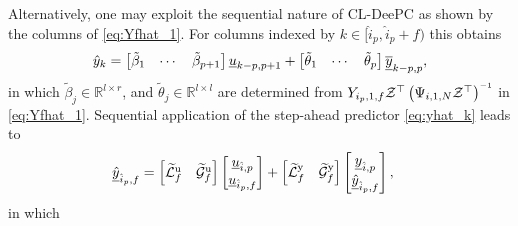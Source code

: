Alternatively, one may exploit the sequential nature of \ac{CL-DeePC} as shown by the columns of \eqref{eq:Yfhat_1}. For columns indexed by $k\in[\hat{i}_p,\hat{i}_p+f)$ this obtains
\begin{align}\label{eq:yhat_k}
    \hat{y}_{k} = \begin{bmatrix} \tilde{\beta}_1 & \cdots & \tilde{\beta}_{p+1} \end{bmatrix} \datavec{u}{k-p,p+1} + \begin{bmatrix} \tilde{\theta}_1 & \cdots & \tilde{\theta}_{p} \end{bmatrix} \datavec{\overline{y}}{k-p,p},%
\end{align}
in which $\tilde{\beta}_j\in\mathbb{R}^{l\times r}$, and $\tilde{\theta}_j\in\mathbb{R}^{l\times l}$ are determined from $Y_{i_p,1,f}\mathcal{Z}^\top\left(\Psi_{i,1,N}\mathcal{Z}^\top\right)\inv$ in \eqref{eq:Yfhat_1}. Sequential application of the step-ahead predictor \eqref{eq:yhat_k} leads to
\begin{align}\label{eq:Sequential1}
    \underline{\hat{y}}_{\hat{i}_p,f} &=
    \begin{bmatrix}
        \widetilde{\mathcal{L}}^\mathrm{u}_f & \widetilde{\mathcal{G}}^\mathrm{u}_f 
    \end{bmatrix}    
    \begin{bmatrix}
        \underline{u}_{\hat{i},p}\\
        \underline{u}_{\hat{i}_p,f}
    \end{bmatrix}+
    \begin{bmatrix}
        \widetilde{\mathcal{L}}^\mathrm{y}_f & \widetilde{\mathcal{G}}^\mathrm{y}_f 
    \end{bmatrix}    
    \begin{bmatrix}
        \underline{y}_{\hat{i},p}\\
        \underline{\hat{y}}_{\hat{i}_p,f}
    \end{bmatrix},
\end{align}
in which
